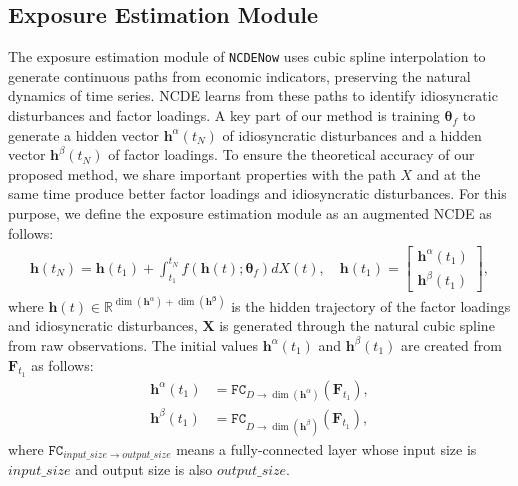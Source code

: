 \documentclass[sigconf]{acmart}
\begin{document}
\subsection{Exposure Estimation Module}\label{subsec:eem}
The exposure estimation module of \texttt{NCDENow} uses cubic spline interpolation to generate continuous paths from economic indicators, preserving the natural dynamics of time series. NCDE learns from these paths to identify idiosyncratic disturbances and factor loadings. A key part of our method is training $\mathbf{\theta}_{f}$ to generate a hidden vector $\mathbf{h}^{\alpha}(t_N)$ of idiosyncratic disturbances and a hidden vector $\mathbf{h}^{\beta}(t_N)$ of factor loadings. To ensure the theoretical accuracy of our proposed method, we share important properties with the path $X$ and at the same time produce better factor loadings and idiosyncratic disturbances. For this purpose, we define the exposure estimation module as an augmented NCDE as follows:
\begin{align} \label{eq:ncde_eq_ours}
        \mathbf{h}(t_N) = \mathbf{h}(t_1) + \int_{t_1}^{t_N} f(\mathbf{h}(t); \mathbf{\theta}_{f})dX(t), \quad
        \mathbf{h}(t_1) = \begin{bmatrix} \mathbf{h}^{\alpha}(t_1) \\ \mathbf{h}^{\beta}(t_1) \end{bmatrix},
\end{align} 
where $\mathbf{h}(t)\in \mathbb{R}^{\dim(\mathbf{h}^{\alpha})+\dim(\mathbf{h}^{\mathbf{\beta}})}$ is the hidden trajectory of the factor loadings and idiosyncratic disturbances, $\mathbf{X}$ is generated through the natural cubic spline from raw observations. 
The initial values $\mathbf{h}^{\alpha}(t_1)$ and $\mathbf{h}^{\beta}(t_1)$ are created from $\mathbf{F}_{t_1}$ as follows:
\begin{align}
    \mathbf{h}^{\alpha}(t_1)&=\texttt{FC}_{D \rightarrow \dim(\mathbf{h}^{\alpha})}(\mathbf{F}_{t_1}), \label{eq:initial_alpha}\\
    \mathbf{h}^{\beta}(t_1)&=\texttt{FC}_{D \rightarrow \dim(\mathbf{h}^{\beta})}(\mathbf{F}_{t_1}),\label{eq:initial_beta}
\end{align}
where $\mathtt{FC}_{input\_size \rightarrow output\_size}$ means a fully-connected layer whose input size is $input\_size$ and output size is also $output\_size$.
\end{document}
